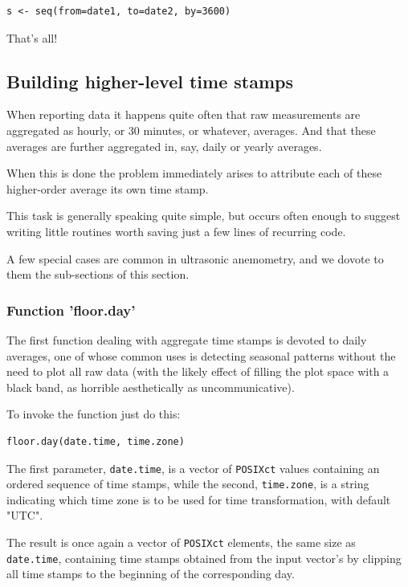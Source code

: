 \documentclass[a4paper,10pt]{book}
\begin{document}
\begin{verbatim}
s <- seq(from=date1, to=date2, by=3600)
\end{verbatim}

\noindent That's all!


\subsection{Building higher-level time stamps}

When reporting data it happens quite often that raw measurements are aggregated as hourly, or 30 minutes, or whatever, averages. And that these averages are further aggregated in, say, daily or yearly averages.

When this is done the problem immediately arises to attribute each of these higher-order average its own time stamp.

This task is generally speaking quite simple, but occurs often enough to suggest writing little routines worth saving just a few lines of recurring code.

A few special cases are common in ultrasonic anemometry, and we dovote to them the sub-sections of this section.

\subsubsection{Function 'floor.day'}

The first function dealing with aggregate time stamps is devoted to daily averages, one of whose common uses is detecting seasonal patterns without the need to plot all raw data (with the likely effect of filling the plot space with a black band, as horrible aesthetically as uncommunicative).

To invoke the function just do this:

\begin{verbatim}
floor.day(date.time, time.zone)
\end{verbatim}

The first parameter, \verb|date.time|, is a vector of \verb|POSIXct| values containing an ordered sequence of time stamps, while the second, \verb|time.zone|, is a string indicating which time zone is to be used for time transformation, with default "UTC".

The result is once again a vector of \verb|POSIXct| elements, the same size as \verb|date.time|, containing time stamps obtained from the input vector's by clipping all time stamps to the beginning of the corresponding day.
\end{document}
